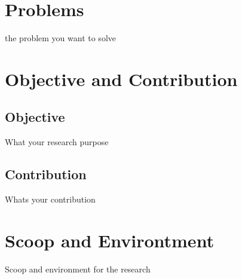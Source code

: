 \section{Problems}
the problem you want to solve

\section{Objective and Contribution}
\subsection{Objective}
What your research purpose

\subsection{Contribution}
Whats your contribution

\section{Scoop and Environtment}
Scoop and environment for the research
